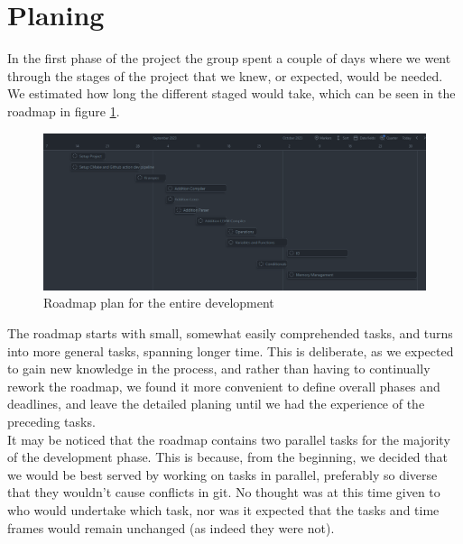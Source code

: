 \section{Planing}
In the first phase of the project the group spent a couple of days where we went through the stages of the project that we knew, or expected, would be needed. We estimated how long the different staged would take, which can be seen in the roadmap in figure \ref{fig:roadmap}.
 
\begin{figure}[h]
\includegraphics[width=\textwidth]{02-Body/Images/Roadmap.png}
\caption{Roadmap plan for the entire development}
\label{fig:roadmap}
\end{figure}

The roadmap starts with small, somewhat easily comprehended tasks, and turns into
more general tasks, spanning longer time. This is deliberate, as we expected to gain
new knowledge in the process, and rather than having to continually rework the
roadmap, we found it more convenient to define overall phases and deadlines, and
leave the detailed planing until we had the experience of the preceding tasks.\\ It
may be noticed that the roadmap contains two parallel tasks for the majority of the
development phase. This is because, from the beginning, we decided that we would be
best served by working on tasks in parallel, preferably so diverse that they wouldn't
cause conflicts in git. No thought was at this time given to who would undertake
which task, nor was it expected that the tasks and time frames would remain unchanged
(as indeed they were not).


